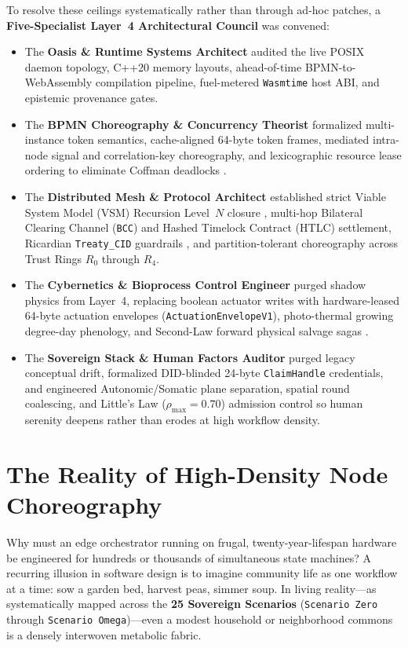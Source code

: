To resolve these ceilings systematically rather than through ad-hoc patches, a
\textbf{Five-Specialist Layer~4 Architectural Council} was convened:
\begin{itemize}
    \item The \textbf{Oasis \& Runtime Systems Architect} audited the live POSIX daemon topology, C++20 memory layouts, ahead-of-time BPMN-to-WebAssembly compilation pipeline, fuel-metered \texttt{Wasmtime} host ABI, and epistemic provenance gates.
    \item The \textbf{BPMN Choreography \& Concurrency Theorist} formalized multi-instance token semantics, cache-aligned 64-byte token frames, mediated intra-node signal and correlation-key choreography, and lexicographic resource lease ordering to eliminate Coffman deadlocks \parencite{coffman1971deadlocks}.
    \item The \textbf{Distributed Mesh \& Protocol Architect} established strict Viable System Model (VSM) Recursion Level~$N$ closure \parencite{beer1972,beer1979}, multi-hop Bilateral Clearing Channel (\texttt{BCC}) and Hashed Timelock Contract (HTLC) settlement, Ricardian \texttt{Treaty\_CID} guardrails \parencite{grigg2004}, and partition-tolerant choreography across Trust Rings $R_0$ through $R_4$.
    \item The \textbf{Cybernetics \& Bioprocess Control Engineer} purged shadow physics from Layer~4, replacing boolean actuator writes with hardware-leased 64-byte actuation envelopes (\texttt{ActuationEnvelopeV1}), photo-thermal growing degree-day phenology, and Second-Law forward physical salvage sagas \parencite{georgescu1971,garciamolina1987sagas}.
    \item The \textbf{Sovereign Stack \& Human Factors Auditor} purged legacy conceptual drift, formalized DID-blinded 24-byte \texttt{ClaimHandle} credentials, and engineered Autonomic/Somatic plane separation, spatial round coalescing, and Little's Law ($\rho_{\max} = 0.70$) admission control \parencite{little1961proof} so human serenity deepens rather than erodes at high workflow density.
\end{itemize}

\section*{The Reality of High-Density Node Choreography}

Why must an edge orchestrator running on frugal, twenty-year-lifespan hardware be engineered
for hundreds or thousands of simultaneous state machines? A recurring illusion in software
design is to imagine community life as one workflow at a time: sow a garden bed, harvest
peas, simmer soup. In living reality---as systematically mapped across the \textbf{25
Sovereign Scenarios} (\texttt{Scenario Zero} through \texttt{Scenario Omega})---even a
modest household or neighborhood commons is a densely interwoven metabolic fabric.

